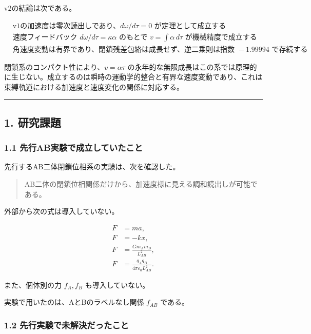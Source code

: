 \documentclass[
  a4paper,
]{ltjsarticle}
\begin{document}
v2の結論は次である。

\[
\boxed{
\begin{aligned}
&\text{v1の加速度は零次読出しであり、}d\omega/d\tau=0\text{ が定理として成立する}\\
&\text{速度フィードバック }d\omega/d\tau=\kappa\alpha\text{ のもとで }v=\int\alpha\,d\tau\text{ が機械精度で成立する}\\
&\text{角速度変動は有界であり、閉鎖残差包絡は成長せず、逆二乗則は指数 }-1.99994\text{ で存続する}
\end{aligned}
}
\]

閉鎖系のコンパクト性により、\(v=\alpha\tau\)
の永年的な無限成長はこの系では原理的に生じない。成立するのは瞬時の運動学的整合と有界な速度変動であり、これは束縛軌道における加速度と速度変化の関係に対応する。

\begin{center}\rule{0.5\linewidth}{0.5pt}\end{center}

\subsection{1. 研究課題}\label{ux7814ux7a76ux8ab2ux984c}

\subsubsection{1.1
先行AB実験で成立していたこと}\label{ux5148ux884cabux5b9fux9a13ux3067ux6210ux7acbux3057ux3066ux3044ux305fux3053ux3068}

先行するAB二体閉鎖位相系の実験は、次を確認した。

\begin{quote}
AB二体の閉鎖位相関係だけから、加速度様に見える調和読出しが可能である。
\end{quote}

外部から次の式は導入していない。

\[
\begin{aligned}
F&=ma,\\
F&=-kx,\\
F&=\frac{Gm_A m_B}{L_{AB}^2},\\
F&=\frac{q_Aq_B}{4\pi\varepsilon_0L_{AB}^2}.
\end{aligned}
\]

また、個体別の力 \(f_A,f_B\) も導入していない。

実験で用いたのは、AとBのラベルなし関係 \(f_{AB}\) である。

\subsubsection{1.2
先行実験で未解決だったこと}\label{ux5148ux884cux5b9fux9a13ux3067ux672aux89e3ux6c7aux3060ux3063ux305fux3053ux3068}
\end{document}
